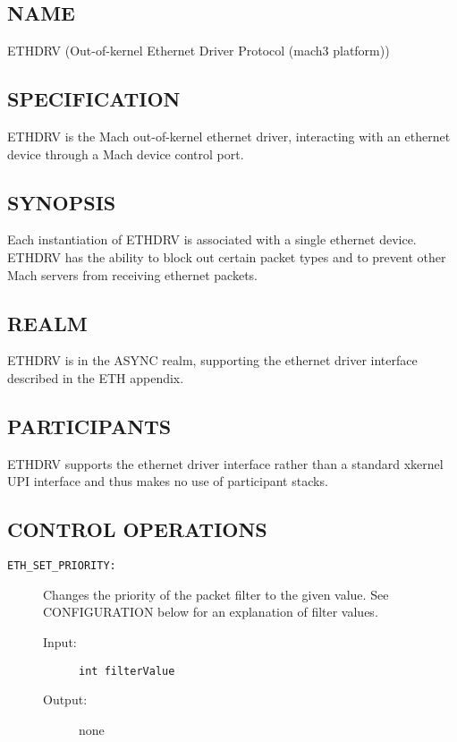 %
%
%

\subsection*{NAME}

\noindent ETHDRV (Out-of-kernel Ethernet Driver Protocol (mach3 platform))

\subsection*{SPECIFICATION}

\noindent

ETHDRV is the Mach out-of-kernel ethernet driver, interacting with an
ethernet device through a Mach device control port.


\subsection*{SYNOPSIS}

\noindent 

Each instantiation of ETHDRV is associated with a single ethernet
device.  ETHDRV has the ability to block out certain packet types and
to prevent other Mach servers from receiving ethernet packets.


\subsection*{REALM}

ETHDRV is in the ASYNC realm, supporting the ethernet driver interface
described in the ETH appendix.


\subsection*{PARTICIPANTS}

ETHDRV supports the ethernet driver interface rather than a standard
xkernel UPI interface and thus makes no use of participant stacks.


\subsection*{CONTROL OPERATIONS}

\begin{description}

\item[{\tt ETH\_SET\_PRIORITY:}]
Changes the priority of the packet filter to the given value.  See
CONFIGURATION below for an explanation of filter values.
\begin{description}
\item[{\rm Input:}] {\tt int filterValue }
\item[{\rm Output:}] none
\end{description}

\end{description}



